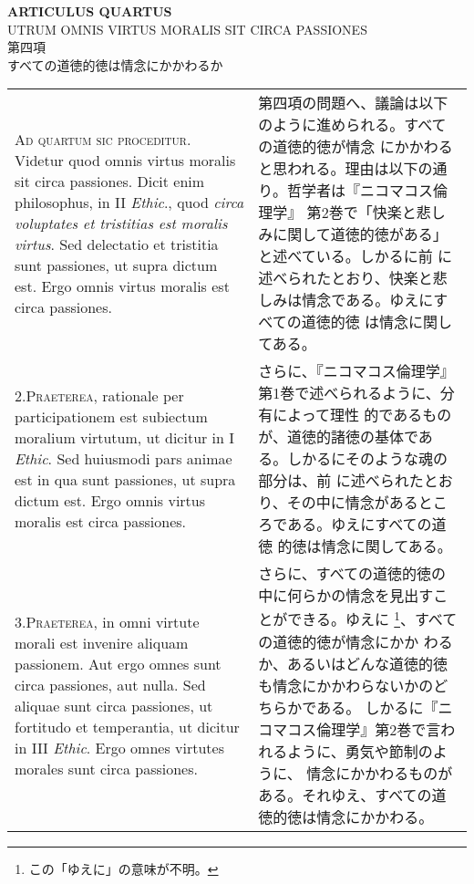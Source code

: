 \documentclass[10pt]{jsarticle}
\begin{document}
\begin{center}
{\Large {\bf ARTICULUS QUARTUS}}\\
{\large UTRUM OMNIS VIRTUS MORALIS SIT CIRCA PASSIONES}\\
{\Large 第四項\\すべての道徳的徳は情念にかかわるか}
\end{center}

\begin{longtable}{p{21em}p{21em}}

{\scshape Ad quartum sic proceditur}. Videtur quod omnis virtus
moralis sit circa passiones. Dicit enim philosophus, in II {\itshape
Ethic}., quod {\itshape circa voluptates et tristitias est moralis
virtus}. Sed delectatio et tristitia sunt passiones, ut supra dictum
est. Ergo omnis virtus moralis est circa passiones.

&

 第四項の問題へ、議論は以下のように進められる。すべての道徳的徳が情念
 にかかわると思われる。理由は以下の通り。哲学者は『ニコマコス倫理学』
 第2巻で「快楽と悲しみに関して道徳的徳がある」と述べている。しかるに前
 に述べられたとおり、快楽と悲しみは情念である。ゆえにすべての道徳的徳
 は情念に関してある。
 
\\


2.{\scshape Praeterea}, rationale per participationem est subiectum
moralium virtutum, ut dicitur in I {\itshape Ethic}. Sed huiusmodi
pars animae est in qua sunt passiones, ut supra dictum est. Ergo omnis
virtus moralis est circa passiones.

&

さらに、『ニコマコス倫理学』第1巻で述べられるように、分有によって理性
的であるものが、道徳的諸徳の基体である。しかるにそのような魂の部分は、前
に述べられたとおり、その中に情念があるところである。ゆえにすべての道徳
的徳は情念に関してある。
 
\\


3.{\scshape Praeterea}, in omni virtute morali est invenire aliquam
passionem. Aut ergo omnes sunt circa passiones, aut nulla. Sed aliquae
sunt circa passiones, ut fortitudo et temperantia, ut dicitur in III
{\itshape Ethic}. Ergo omnes virtutes morales sunt circa passiones.

&

さらに、すべての道徳的徳の中に何らかの情念を見出すことができる。ゆえに
\footnote{この「ゆえに」の意味が不明。}、すべての道徳的徳が情念にかか
わるか、あるいはどんな道徳的徳も情念にかかわらないかのどちらかである。
しかるに『ニコマコス倫理学』第2巻で言われるように、勇気や節制のように、
情念にかかわるものがある。それゆえ、すべての道徳的徳は情念にかかわる。
 

\end{longtable}
\end{document}
